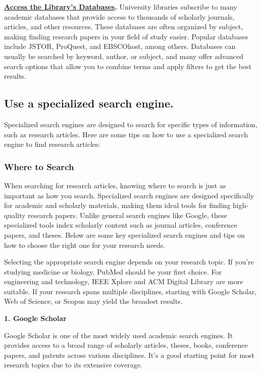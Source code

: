 \documentclass[
]{book}
\begin{document}
\href{https://libguides.siue.edu/az.php}{\textbf{Access the Library's Databases}}\textbf{.} University libraries subscribe to many academic databases that provide access to thousands of scholarly journals, articles, and other resources. These databases are often organized by subject, making finding research papers in your field of study easier. Popular databases include JSTOR, ProQuest, and EBSCOhost, among others. Databases can usually be searched by keyword, author, or subject, and many offer advanced search options that allow you to combine terms and apply filters to get the best results.

\subsection*{Use a specialized search engine.}\label{use-a-specialized-search-engine.}

Specialized search engines are designed to search for specific types of information, such as research articles. Here are some tips on how to use a specialized search engine to find research articles:

\subsubsection*{Where to Search}\label{where-to-search}

When searching for research articles, knowing where to search is just as important as how you search. Specialized search engines are designed specifically for academic and scholarly materials, making them ideal tools for finding high-quality research papers. Unlike general search engines like Google, these specialized tools index scholarly content such as journal articles, conference papers, and theses. Below are some key specialized search engines and tips on how to choose the right one for your research needs.

Selecting the appropriate search engine depends on your research topic. If you're studying medicine or biology, PubMed should be your first choice. For engineering and technology, IEEE Xplore and ACM Digital Library are more suitable. If your research spans multiple disciplines, starting with Google Scholar, Web of Science, or Scopus may yield the broadest results.

\textbf{1. Google Scholar}

Google Scholar is one of the most widely used academic search engines. It provides access to a broad range of scholarly articles, theses, books, conference papers, and patents across various disciplines. It's a good starting point for most research topics due to its extensive coverage.
\end{document}
